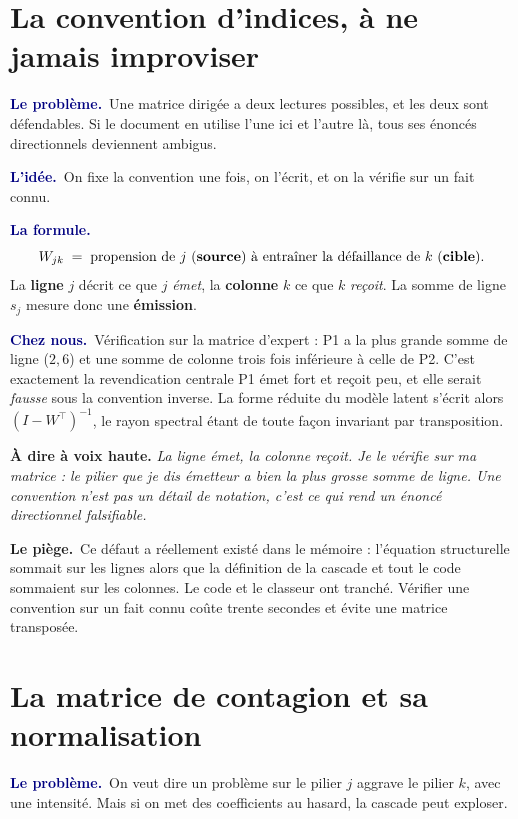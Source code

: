 \documentclass[11pt,a4paper]{article}
\newcommand{\lequoi}[1]{\smallskip\noindent\textcolor{navy}{\textbf{Le problème.}}\ #1\par}
\newcommand{\lidee}[1]{\smallskip\noindent\textcolor{navy}{\textbf{L'idée.}}\ #1\par}
\newcommand{\laformule}[1]{\smallskip\noindent\textcolor{navy}{\textbf{La formule.}}\ #1\par}
\newcommand{\cheznous}[1]{\smallskip\noindent\textcolor{navy}{\textbf{Chez nous.}}\ #1\par}
\newcommand{\lepiege}[1]{\smallskip\noindent\textcolor{accent}{\textbf{Le piège.}}\ #1\par}
\newcommand{\laphrase}[1]{\begin{phrasebox}\textbf{À dire à voix haute.} \emph{#1}\end{phrasebox}}
\begin{document}
\section{La convention d'indices, à ne jamais improviser}

\lequoi{Une matrice dirigée a deux lectures possibles, et les deux sont défendables. Si le
document en utilise l'une ici et l'autre là, tous ses énoncés directionnels deviennent
ambigus.}

\lidee{On fixe la convention une fois, on l'écrit, et on la vérifie sur un fait connu.}

\laformule{\[
  W_{jk}\;=\;\text{propension de } j \text{ (\textbf{source}) à entraîner la défaillance de }
  k \text{ (\textbf{cible}).}
\]
La \textbf{ligne} $j$ décrit ce que $j$ \emph{émet}, la \textbf{colonne} $k$ ce que $k$
\emph{reçoit}. La somme de ligne $s_j$ mesure donc une \textbf{émission}.}

\cheznous{Vérification sur la matrice d'expert : P1 a la plus grande somme de ligne ($2{,}6$)
et une somme de colonne trois fois inférieure à celle de P2. C'est exactement la revendication
centrale \og{}P1 émet fort et reçoit peu\fg{}, et elle serait \emph{fausse} sous la convention
inverse. La forme réduite du modèle latent s'écrit alors $(I-W^{\top})^{-1}$, le rayon spectral
étant de toute façon invariant par transposition.}

\laphrase{La ligne émet, la colonne reçoit. Je le vérifie sur ma matrice : le pilier que je dis
émetteur a bien la plus grosse somme de ligne. Une convention n'est pas un détail de notation,
c'est ce qui rend un énoncé directionnel falsifiable.}

\lepiege{Ce défaut a réellement existé dans le mémoire : l'équation structurelle sommait sur
les lignes alors que la définition de la cascade et tout le code sommaient sur les colonnes. Le
code et le classeur ont tranché. Vérifier une convention sur un fait connu coûte trente
secondes et évite une matrice transposée.}

\section{La matrice de contagion et sa normalisation}

\lequoi{On veut dire \og un problème sur le pilier $j$ aggrave le pilier $k$\fg{}, avec une
intensité. Mais si on met des coefficients au hasard, la cascade peut exploser.}
\end{document}
